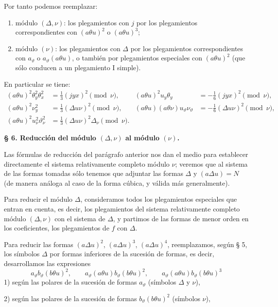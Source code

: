 \documentclass[11pt]{article}
\newcommand{\A}{\Delta}
\begin{document}
Por tanto podemos reemplazar:
\begin{enumerate}
\item módulo $(\A,\nu)$: los plegamientos con $j$ por los plegamientos correspondientes con $(a\theta u)^2$ o $(a\theta u)^3$;
\item módulo $(\nu)$: los plegamientos con $\A$ por los plegamientos correspondientes con $a_\vartheta$ o $a_\vartheta(a\theta u)$, o también por plegamientos especiales con $(a\theta u)^2$ (que sólo conducen a un plegamiento I simple).
\end{enumerate}
En particular se tiene:
\[
\begin{aligned}
(a\theta u)^2\theta_y^2\theta_x^2&=\frac13(jyx)^2\pmod{\nu},&
(a\theta u)^2u_y\theta_y&=-\frac16(jyx)^2\pmod{\nu},\\
(a\theta u)^2\nu_y^2&=\frac13(\A u\nu)^2\pmod{\nu},&
(a\theta u)(a\theta\nu)u_\vartheta\nu_\vartheta&=-\frac16(\A u\nu)^2\pmod{\nu},\\
(a\theta u)^2u_\nu^2\vartheta_\nu^2&=\frac13(\A u\nu)^2\A_\nu\pmod{\nu}.
\end{aligned}
\]

\begin{center}
\textbf{§ 6. \quad Reducción del módulo $(\A,\nu)$ al módulo $(\nu)$.}
\end{center}

Las fórmulas de reducción del parágrafo anterior nos dan el medio para establecer directamente el sistema relativamente completo módulo $\nu$; veremos que al sistema de las formas tomadas sólo tenemos que adjuntar las formas $\A$ y $(a\A u)=N$ (de manera análoga al caso de la forma cúbica, y válida más generalmente).

Para reducir el módulo $\A$, consideramos todos los plegamientos especiales que entran en cuenta, es decir, los plegamientos del sistema relativamente completo módulo $(\A,\nu)$ con el sistema de $\A$, y partimos de las formas de menor orden en los coeficientes, los plegamientos de $f$ con $\A$.

Para reducir las formas $(a\A u)^2$, $(a\A u)^3$, $(a\A u)^4$, reemplazamos, según § 5, los símbolos $\A$ por formas inferiores de la sucesión de formas, es decir, desarrollamos las expresiones
\[
a_\vartheta b_\vartheta(b\theta u)^2,\qquad
a_\vartheta(a\theta u)b_\vartheta(b\theta u)^2,\qquad
a_\vartheta(a\theta u)b_\vartheta(b\theta u)^3
\]
1) según las polares de la sucesión de formas $a_\vartheta$ (símbolos $\A$ y $\nu$),

2) según las polares de la sucesión de formas $b_\vartheta(b\theta u)^2$ (símbolos $\nu$),
\end{document}
